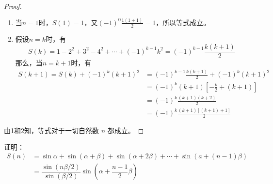 \begin{proof}
\begin{enumerate}
    \item 当$n=1$时，$S(1)=1$，又$(-1)^0\frac{1(1+1)}{2}=1$，所以等式成立。

\item 假设$n=k$时，有
\[S(k)=1-2^2+3^2-4^2+\cdots+(-1)^{k-1}k^2=(-1)^{k-1}\frac{k(k+1)}{2}\]
那么，当$n=k+1$时，有    
\[\begin{split}
    S(k+1)=S(k)+(-1)^k(k+1)^2&=(-1)^{k-1}\frac{k(k+1)}{2}+(-1)^k(k+1)^2\\
    &=(-1)^k(k+1)\left[-\frac{k}{2}+(k+1)\right]\\
    &=(-1)^k \frac{(k+1)(k+2)}{2}\\
    &=(-1)^k \frac{(k+1)[(k+1)+1]}{2}
\end{split}\]
\end{enumerate}

由1和2知，等式对于一切自然数 $n$ 都成立。
\end{proof}


\begin{example}
证明：
\[\begin{split}
    S(n)&= \sin \alpha+\sin (\alpha+\beta)+\sin (\alpha+2 \beta)+\cdots+\sin (a+(n-1) \beta) \\
&= \dfrac{\sin(n\beta/2)}{\sin(\beta/2)} \sin \left(\alpha+\dfrac{n-1}{2} \beta\right)
\end{split}\]
\end{example}

